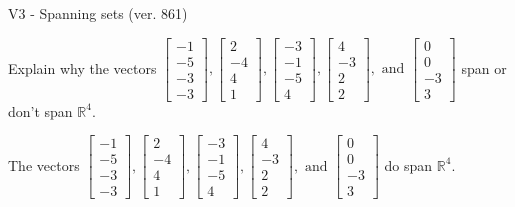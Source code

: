 \begin{exercise}
  \begin{exerciseTitle}V3 - Spanning sets (ver. 861)\end{exerciseTitle}
  \begin{exerciseStatement}
    Explain why the vectors \(\left[\begin{array}{r}
-1 \\
-5 \\
-3 \\
-3
\end{array}\right] , \left[\begin{array}{r}
2 \\
-4 \\
4 \\
1
\end{array}\right] , \left[\begin{array}{r}
-3 \\
-1 \\
-5 \\
4
\end{array}\right] , \left[\begin{array}{r}
4 \\
-3 \\
2 \\
2
\end{array}\right] , \text{ and } \left[\begin{array}{r}
0 \\
0 \\
-3 \\
3
\end{array}\right]\) span or don't span \(\mathbb{R}^4\). 
	


  \end{exerciseStatement}
  \begin{exerciseAnswer}
   The vectors \(\left[\begin{array}{r}
-1 \\
-5 \\
-3 \\
-3
\end{array}\right] , \left[\begin{array}{r}
2 \\
-4 \\
4 \\
1
\end{array}\right] , \left[\begin{array}{r}
-3 \\
-1 \\
-5 \\
4
\end{array}\right] , \left[\begin{array}{r}
4 \\
-3 \\
2 \\
2
\end{array}\right] , \text{ and } \left[\begin{array}{r}
0 \\
0 \\
-3 \\
3
\end{array}\right]\) 
  	 do  
	span \(\mathbb{R}^4\).
  



\end{exerciseAnswer}
\end{exercise}

